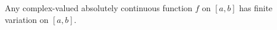 Any complex-valued absolutely continuous function $f$ on $[a, b]$ has finite variation on $[a, b]$.
